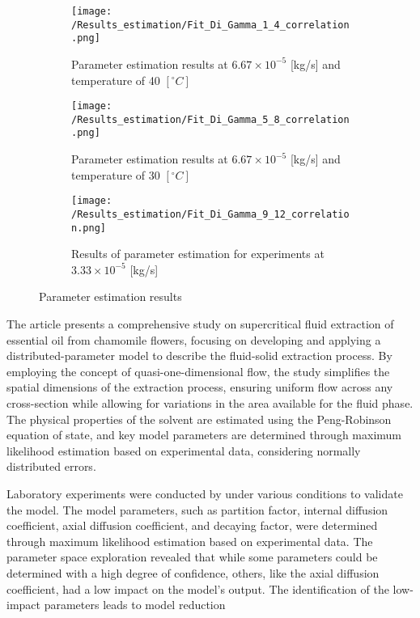 \documentclass[a4paper,fleqn]{cas-dc}
\begin{document}
\begin{figure*}[!h]
	\centering
	\begin{subfigure}{0.3\textwidth}
		\centering
		\texttt{[image: /Results\_estimation/Fit\_Di\_Gamma\_1\_4\_correlation.png]}
		\caption{Parameter estimation results at $6.67\times 10^{-5}$ [kg/s] and temperature of 40 $[^\circ C]$}
		\label{fig: Fit_1_4_Di_Gamma_correlation}
	\end{subfigure}
	\hfill
	\begin{subfigure}{0.3\textwidth}
		\centering
		\texttt{[image: /Results\_estimation/Fit\_Di\_Gamma\_5\_8\_correlation.png]}
		\caption{Parameter estimation results at $6.67\times 10^{-5}$ [kg/s] and temperature of 30 $[^\circ C]$}
		\label{fig: Fit_5_8_Di_Gamma_correlation}
	\end{subfigure}
	\hfill
	\begin{subfigure}{0.3\textwidth}
		\centering
		\texttt{[image: /Results\_estimation/Fit\_Di\_Gamma\_9\_12\_correlation.png]}
		\caption{Results of parameter estimation for experiments at $3.33\times 10^{-5}$ [kg/s]}
		\label{fig: Fit_9_12_Di_Gamma_correlation}
	\end{subfigure}
	\caption{Parameter estimation results}
	\label{fig: Fit_Di_Gamma_correlation}
\end{figure*}

The article presents a comprehensive study on supercritical fluid extraction of essential oil from chamomile flowers, focusing on developing and applying a distributed-parameter model to describe the fluid-solid extraction process. By employing the concept of quasi-one-dimensional flow, the study simplifies the spatial dimensions of the extraction process, ensuring uniform flow across any cross-section while allowing for variations in the area available for the fluid phase. The physical properties of the solvent are estimated using the Peng-Robinson equation of state, and key model parameters are determined through maximum likelihood estimation based on experimental data, considering normally distributed errors.

Laboratory experiments were conducted by \citet{Povh2001} under various conditions to validate the model. The model parameters, such as partition factor, internal diffusion coefficient, axial diffusion coefficient, and decaying factor, were determined through maximum likelihood estimation based on experimental data. The parameter space exploration revealed that while some parameters could be determined with a high degree of confidence, others, like the axial diffusion coefficient, had a low impact on the model's output. The identification of the low-impact parameters leads to model reduction
\end{document}
